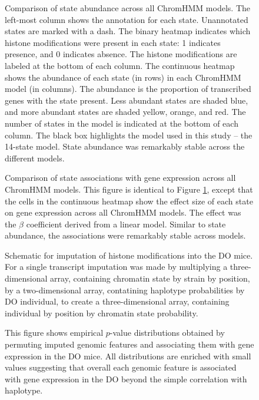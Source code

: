 \documentclass[
  11pt,
]{article}
\begin{document}
\begin{figure}[ht!]
\caption{Comparison of state abundance across all ChromHMM models. The left-most column
shows the annotation for each state. Unannotated states are marked with a dash. The 
binary heatmap indicates which histone modifications were present in each state: 1 
indicates presence, and 0 indicates absence. The histone modifications are labeled
at the bottom of each column. The continuous heatmap shows the abundance of each state
(in rows) in each ChromHMM model (in columns). The abundance is the proportion of 
transcribed genes with the state present. Less abundant states are shaded blue, and 
more abundant states are shaded yellow, orange, and red. The number of states in the
model is indicated at the bottom of each column. The black box highlights the model
used in this study -- the 14-state model. State abundance was remarkably
stable across the different models.}
\label{supp_fig:model_abundance_comparison}
\end{figure}

\begin{figure}[ht!]
\caption{Comparison of state associations with gene expression across all 
ChromHMM models. This figure is identical to Figure 
\ref{supp_fig:model_abundance_comparison}, except that the cells in the 
continuous heatmap show the effect size of each state on gene expression
across all ChromHMM models. The effect was the $\beta$ coefficient derived from
a linear model. Similar to state abundance, the associations were remarkably 
stable across models.}
\label{supp_fig:model_effect_comparison}
\end{figure}

\begin{figure}[ht!]
\caption{Schematic for imputation of histone modifications into the 
DO mice. For a single transcript imputation was made by multiplying 
a three-dimensional array, containing chromatin state by strain by
position, by a two-dimensional array, contatining haplotype probabilities
by DO individual, to create a three-dimensional array, containing 
individual by position by chromatin state probability.}
\label{supp_fig:imputation}
\end{figure}

\begin{figure}[ht!]
\caption{This figure shows empirical $p$-value distributions obtained
by permuting imputed genomic features and associating them
with gene expression in the DO mice. All distributions are
enriched with small values suggesting that overall each 
genomic feature   is associated with gene expression in the DO
beyond the simple correlation with haplotype.
}
\label{supp_fig:empirical_p}
\end{figure}

\pagebreak


\end{document}
